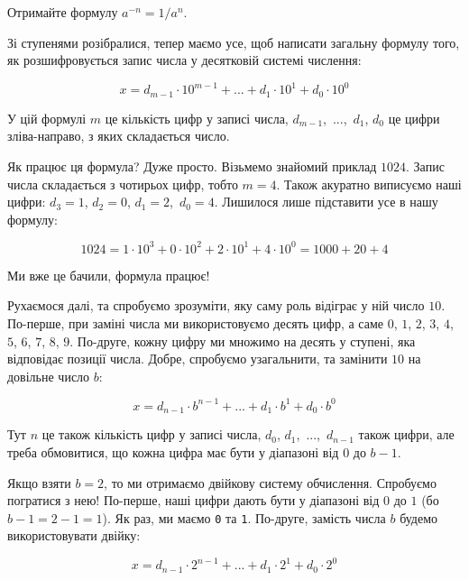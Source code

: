 \documentclass{book}
\newcommand{\bitstr}[1]{{\tt #1}}
\begin{document}
\begin{exercise}
Отримайте формулу $a^{-n}=1/a^n$.
\end{exercise}

Зі ступенями розібралися, тепер маємо усе, щоб написати загальну формулу того, як розшифровується запис числа у десятковій системі числення:

\begin{equation}
x = d_{m-1} \cdot 10^{m-1} + ... + d_1 \cdot 10^1 + d_0 \cdot 10^0
\label{FormulaTenNum}
\end{equation}

У цій формулі $m$ це кількість цифр у записі числа, $d_{m-1}$,~...,~$d_1$, $d_0$ це цифри зліва-направо, з яких складається число.

Як працює ця формула? Дуже просто. Візьмемо знайомий приклад $1024$.
Запис числа складається з чотирьох цифр, тобто $m=4$.
Також акуратно виписуємо наші цифри: $d_3=1$, $d_2=0$, $d_1=2$,~$d_0=4$.
Лишилося лише підставити усе в нашу формулу:

$$ 1024 = 1 \cdot 10^3 + 0 \cdot 10^2 + 2 \cdot 10^1 + 4 \cdot 10 ^ 0 = 1000 + 20 + 4 $$

Ми вже це бачили, формула працює!

Рухаємося далі, та спробуємо зрозуміти, яку саму роль відіграє у ній число $10$.
По-перше, при заміні числа ми використовуємо десять цифр, а саме $0$, $1$, $2$, $3$, $4$, $5$, $6$, $7$, $8$, $9$.
По-друге, кожну цифру ми множимо на десять у ступені, яка відповідає позиції числа.
Добре, спробуємо узагальнити, та замінити $10$ на довільне число $b$:

\begin{equation}
x = d_{n-1} \cdot b^{n-1} + ... + d_1 \cdot b^1 + d_0 \cdot b^0
\label{FormulaBNum}
\end{equation}

Тут $n$ це також кількість цифр у записі числа, $d_0$, $d_1$,~...,~$d_{n-1}$ також цифри, але треба обмовитися, що кожна цифра має бути у діапазоні від $0$ до $b-1$.

Якщо взяти $b=2$, то ми отримаємо двійкову систему обчислення.
Спробуємо погратися з нею!
По-перше, наші цифри дають бути у діапазоні від $0$ до $1$ (бо $b-1=2-1=1$).
Як раз, ми маємо \bitstr{0} та \bitstr{1}.
По-друге, замість числа $b$ будемо використовувати двійку:

\begin{equation}
x = d_{n-1} \cdot 2^{n-1} + ... + d_1 \cdot 2^1 + d_0 \cdot 2^0
\label{FormulaTwoNum}
\end{equation}
\end{document}
